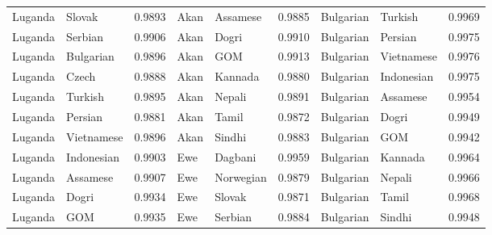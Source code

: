 \documentclass[11pt]{article} %
\begin{document}
\begin{table}
\begin{tabular}{llr@{\hspace{12pt}}llr@{\hspace{12pt}}llr}
            Luganda                      & Slovak              & 0.9893        & Akan                & Assamese            & 0.9885        & Bulgarian           & Turkish             & 0.9969        \\
            Luganda                      & Serbian             & 0.9906        & Akan                & Dogri               & 0.9910        & Bulgarian           & Persian             & 0.9975        \\
            Luganda                      & Bulgarian           & 0.9896        & Akan                & GOM                 & 0.9913        & Bulgarian           & Vietnamese          & 0.9976        \\
            Luganda                      & Czech               & 0.9888        & Akan                & Kannada             & 0.9880        & Bulgarian           & Indonesian          & 0.9975        \\
            Luganda                      & Turkish             & 0.9895        & Akan                & Nepali              & 0.9891        & Bulgarian           & Assamese            & 0.9954        \\
            Luganda                      & Persian             & 0.9881        & Akan                & Tamil               & 0.9872        & Bulgarian           & Dogri               & 0.9949        \\
            Luganda                      & Vietnamese          & 0.9896        & Akan                & Sindhi              & 0.9883        & Bulgarian           & GOM                 & 0.9942        \\
            Luganda                      & Indonesian          & 0.9903        & Ewe                 & Dagbani             & 0.9959        & Bulgarian           & Kannada             & 0.9964        \\
            Luganda                      & Assamese            & 0.9907        & Ewe                 & Norwegian           & 0.9879        & Bulgarian           & Nepali              & 0.9966        \\
            Luganda                      & Dogri               & 0.9934        & Ewe                 & Slovak              & 0.9871        & Bulgarian           & Tamil               & 0.9968        \\
            Luganda                      & GOM                 & 0.9935        & Ewe                 & Serbian             & 0.9884        & Bulgarian           & Sindhi              & 0.9948        \\

\end{tabular}
\end{table}
\end{document}
